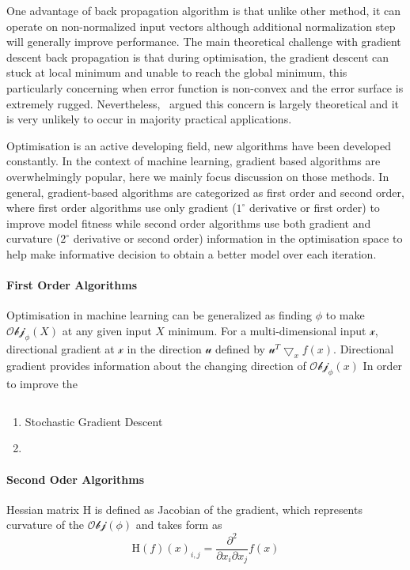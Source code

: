 One advantage of back propagation algorithm is that unlike other method, it can operate on non-normalized input vectors although additional normalization step will generally improve performance. \cite{Buckland:2002} The main theoretical challenge with gradient descent back propagation is that during optimisation, the gradient descent can stuck at local minimum and unable to reach the global minimum, this particularly concerning when error function is non-convex and the error surface is extremely rugged. Nevertheless,~\citet{LeCun_2015} argued this concern is largely theoretical and it is very unlikely to occur in majority practical applications.

Optimisation is an active developing field, new algorithms have been developed constantly. In the context of machine learning, gradient based algorithms are overwhelmingly popular, here we mainly focus discussion on those methods. In general, gradient-based algorithms are categorized as first order and second order, where first order algorithms use only gradient ($1^\circ$ derivative or first order) to improve model fitness while second order algorithms use both gradient and curvature ($2^\circ$ derivative or second order) information in the optimisation space to help make informative decision to obtain a better model over each iteration. \\

\paragraph {First Order Algorithms}
Optimisation in machine learning can be generalized as finding $\phi$ to make $\mathcal{Obj}_{\phi}(X)$ at any given input $X$ minimum. For a multi-dimensional input $\mathcal{x}$, directional gradient at $\mathcal{x}$ in the direction $\mathcal{u}$ defined by $\mathcal{u}^T\bigtriangledown_xf(x)$. Directional gradient provides information about the changing direction of $\mathcal{Obj}_{\phi}(x)$  In order to improve the  

\begin{equation}
    
\end{equation}

\begin{enumerate}
    \item Stochastic Gradient Descent \\
    \item \\
\end{enumerate}

\paragraph{Second Oder Algorithms}
Hessian matrix $\mathrm{H}$ is defined as Jacobian of the gradient, which represents curvature of the $\mathcal{Obj}(\phi)$ and takes form as 
\begin{equation}
    \mathrm{H}(f)(x)_{i,j} = \frac{\partial^2}{\partial x_i \partial x_j}f(x)
\end{equation}
